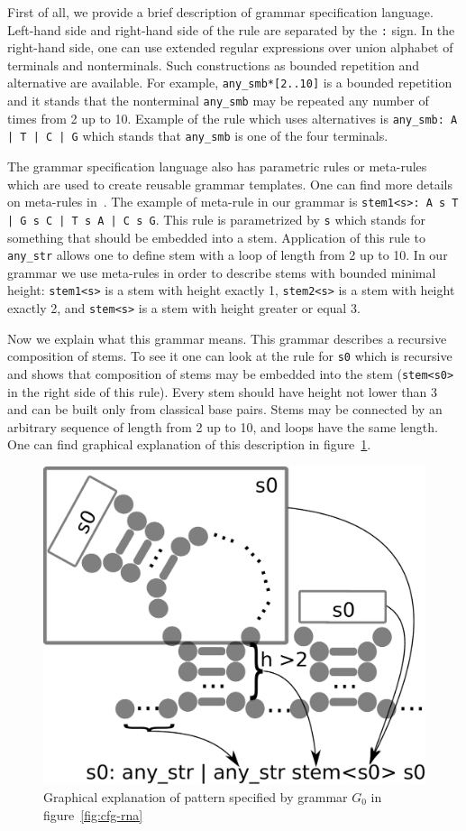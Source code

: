 \documentclass[a4paper,twoside]{article}
\begin{document}
First of all, we provide a brief description of grammar specification language.
Left-hand side and right-hand side of the rule are separated by the \verb|:| sign.
In the right-hand side, one can use extended regular expressions over union alphabet of terminals and nonterminals.
Such constructions as bounded repetition and alternative are available.
For example, \verb|any_smb*[2..10]| is a bounded repetition and it stands that the nonterminal \verb|any_smb| may be repeated any number of times from 2 up to 10.
Example of the rule which uses alternatives is \texttt{any\_smb: A | T | C | G} which stands that \verb|any_smb| is one of the four terminals.

The grammar specification language also has parametric rules or meta-rules which are used to create reusable grammar templates.
One can find more details on meta-rules in~\cite{Thiemann:2008:MCG:1389449.1389465}.
The example of meta-rule in our grammar is \texttt{stem1<s>: A s T | G s C | T s A | C s G}.
This rule is parametrized by \verb|s| which stands for something that should be embedded into a stem.
Application of this rule to \verb|any_str| allows one to define stem with a loop of length from 2 up to 10.
In our grammar we use meta-rules in order to describe stems with bounded minimal height: \verb|stem1<s>| is a stem with height exactly 1,  \verb|stem2<s>| is a stem with height exactly 2, and \verb|stem<s>| is a stem with height greater or equal 3.

Now we explain what this grammar means.
This grammar describes a recursive composition of stems.
To see it one can look at the rule for \verb|s0| which is recursive and shows that composition of stems may be embedded into the stem (\verb|stem<s0>| in the right side of this rule).
Every stem should have height not lower than 3 and can be built only from classical base pairs.
Stems may be connected by an arbitrary sequence of length from 2 up to 10, and loops have the same length.
One can find graphical explanation of this description in figure~\ref{fig:cfg-rna-graphical}.

\begin{figure}
\centering
\includegraphics[width=.45\textwidth]{figures/16sgrammar.pdf}
\caption{Graphical explanation of pattern specified by grammar $G_0$ in figure~\ref{fig:cfg-rna}}
\label{fig:cfg-rna-graphical}
\end{figure}
\end{document}
